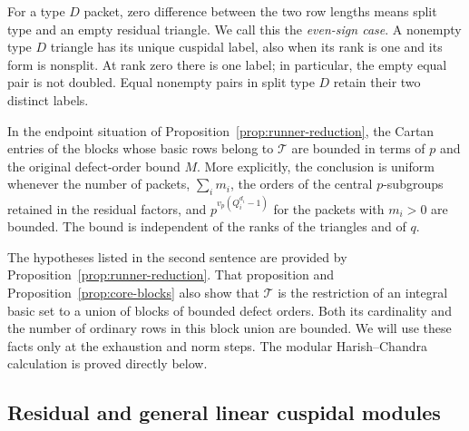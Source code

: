 For a type $D$ packet, zero difference between the two row lengths
means split type and an empty residual triangle.  We call this the
\emph{even-sign case}.  A nonempty type $D$ triangle has its unique
cuspidal label, also when its rank is one and its form is nonsplit.
At rank zero there is one label; in particular, the empty equal pair
is not doubled.  Equal nonempty pairs in split type $D$ retain their
two distinct labels.

\begin{proposition}\label{prop:triangle-cartan}
In the endpoint situation of Proposition~\ref{prop:runner-reduction},
the Cartan entries of the blocks whose basic rows belong to
$\mathcal T$ are bounded in terms of $p$ and the original defect-order
bound $M$.
More explicitly, the conclusion is uniform whenever the number of
packets, $\sum_i m_i$, the orders of the central $p$-subgroups retained
in the residual factors, and
$p^{v_p(Q_i^{d_i}-1)}$ for the packets with $m_i>0$ are bounded.
The bound is independent of the ranks of the triangles and of $q$.
\end{proposition}

The hypotheses listed in the second sentence are provided by
Proposition~\ref{prop:runner-reduction}.  That proposition and
Proposition~\ref{prop:core-blocks} also show that $\mathcal T$ is the
restriction of an integral basic set to a union of blocks of bounded
defect orders.  Both its cardinality and the number of ordinary rows
in this block union are bounded.  We will use these facts only at the
exhaustion and norm steps.  The modular Harish--Chandra calculation is
proved directly below.

\subsection{Residual and general linear cuspidal modules}

